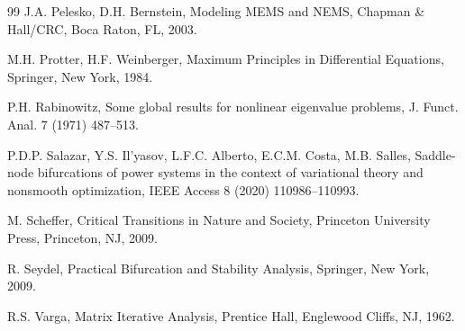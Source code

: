 \documentclass[preprint,10pt]{elsarticle}
\numberwithin{equation}{section}
\begin{document}
\begin{thebibliography}{99}
	J.A. Pelesko, D.H. Bernstein, Modeling MEMS and NEMS, Chapman \& Hall/CRC,
	Boca Raton, FL, 2003.
	
	
	M.H. Protter, H.F. Weinberger, Maximum Principles in Differential Equations,
	Springer, New York, 1984.
	
	P.H. Rabinowitz, Some global results for nonlinear eigenvalue problems,
	J. Funct. Anal. 7 (1971) 487--513.
	
	P.D.P. Salazar, Y.S. Il'yasov, L.F.C. Alberto, E.C.M. Costa, M.B. Salles,
	Saddle-node bifurcations of power systems in the context of variational theory
	and nonsmooth optimization, IEEE Access 8 (2020) 110986--110993.
	
	M. Scheffer, Critical Transitions in Nature and Society, Princeton University
	Press, Princeton, NJ, 2009.
	
	R. Seydel, Practical Bifurcation and Stability Analysis, Springer, New York,
	2009.
	
	R.S. Varga, Matrix Iterative Analysis, Prentice Hall, Englewood Cliffs, NJ,
	1962.
	

	
\end{thebibliography}
\end{document}
